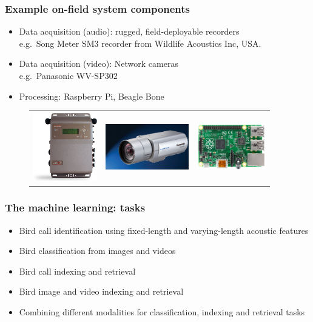 \documentclass[mathserif]{beamer}
\begin{document}
\begin{frame}
\frametitle{Example on-field system components}
\vspace{-1cm}
\vspace{0.3cm}
\begin{itemize}
\item Data acquisition (audio): rugged, field-deployable recorders \\
e.g.~Song Meter SM3 recorder from Wildlife Acoustics Inc, USA. \\
\item Data acquisition (video): Network cameras \\
e.g.~Panasonic WV-SP302\\
\item Processing: Raspberry Pi, Beagle Bone 
\end{itemize}
\begin{figure}
	\begin{tabular}{c c c}
	\includegraphics[height=3cm]{figures/songMeter.png}&
	\includegraphics[height=2cm]{figures/pan_cam.png}&
	\includegraphics[height=2cm]{figures/rasp.jpg}
	\end{tabular}
	\end{figure}
\end{frame}


\begin{frame}
\frametitle{The machine learning: tasks}
\begin{itemize}
\item<2-> Bird call identification using fixed-length and varying-length acoustic features 
\item<3-> Bird classification from images and videos
\item<4-> Bird call indexing and retrieval
\item<5-> Bird image and video indexing and retrieval
\item<6-> Combining different modalities for classification, indexing and retrieval tasks
\end{itemize}
\end{frame}
\end{document}
